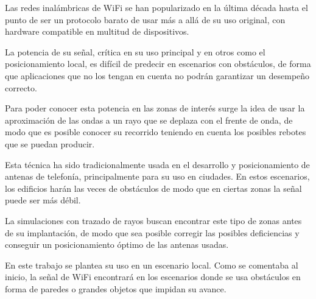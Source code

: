 Las redes inalámbricas de WiFi se han popularizado en la última década hasta el punto de ser un protocolo barato de usar más a allá de su uso original, con hardware compatible en multitud de dispositivos.

La potencia de su señal, crítica en su uso principal y en otros como el posicionamiento local, es difícil de predecir en escenarios con obstáculos, de forma que aplicaciones que no los tengan en cuenta no podrán garantizar un desempeño correcto.

Para poder conocer esta potencia en las zonas de interés surge la idea de usar la aproximación de las ondas a un rayo que se deplaza con el frente de onda, de modo que es posible conocer su recorrido teniendo en cuenta los posibles rebotes que se puedan producir.

Esta técnica ha sido tradicionalmente usada en el desarrollo y posicionamiento de antenas de telefonía, principalmente para su uso en ciudades.
En estos escenarios, los edificios harán las veces de obstáculos de modo que en ciertas zonas la señal puede ser más débil.

La simulaciones con trazado de rayos buscan encontrar este tipo de zonas antes de su implantación, de modo que sea posible corregir las posibles deficiencias y conseguir un posicionamiento óptimo de las antenas usadas.

En este trabajo se plantea su uso en un escenario local.
Como se comentaba al inicio, la señal de WiFi encontrará en los escenarios donde se usa obstáculos en forma de paredes o grandes objetos que impidan su avance.
